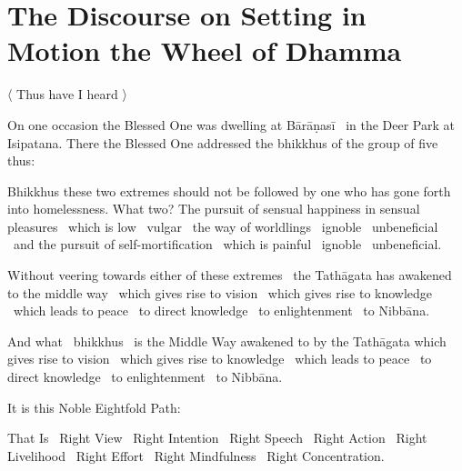 \section{The Discourse on Setting in Motion the Wheel of Dhamma}
\label{wheel-of-dhamma-full}

\begin{leader-english}
  〈 Thus have I heard 〉
\end{leader-english}

\smallskip

\begin{english-hang}
  On one occasion the Blessed One was dwelling at Bārāṇasī \breathmark\ in the Deer Park at Isipatana. There the Blessed One addressed the bhikkhus of the group of five thus:
\end{english-hang}

\begin{english-hang}
  Bhikkhus these two extremes should not be followed by one who has gone forth into homelessness. What two? The pursuit of sensual happiness in sensual pleasures \breathmark\ which is low \breathmark\ vulgar \breathmark\ the way of worldlings \breathmark\ ignoble \breathmark\ unbeneficial \breathmark\ and the pursuit of self-mortification \breathmark\ which is painful \breathmark\ ignoble \breathmark\ unbeneficial.
\end{english-hang}

\begin{english-hang}
  Without veering towards either of these extremes \breathmark\ the Tathāgata has awakened to the middle way \breathmark\ which gives rise to vision \breathmark\ which gives rise to knowledge \breathmark\ which leads to peace \breathmark\ to direct knowledge \breathmark\ to enlightenment \breathmark\ to Nibbāna.
\end{english-hang}

\begin{english-hang}
  And what \breathmark\ bhikkhus \breathmark\ is the Middle Way awakened to by the Tathāgata which gives rise to vision \breathmark\ which gives rise to knowledge \breathmark\ which leads to peace \breathmark\ to direct knowledge \breathmark\ to enlightenment \breathmark\ to Nibbāna.
\end{english-hang}

\begin{english-hang}
  It is this Noble Eightfold Path:
\end{english-hang}

\begin{english-hang}
  That Is \breathmark\ Right View \breathmark\ Right Intention \breathmark\ Right Speech \breathmark\ Right Action \breathmark\ Right Livelihood \breathmark\ Right Effort \breathmark\ Right Mindfulness \breathmark\ Right Concentration.
\end{english-hang}

